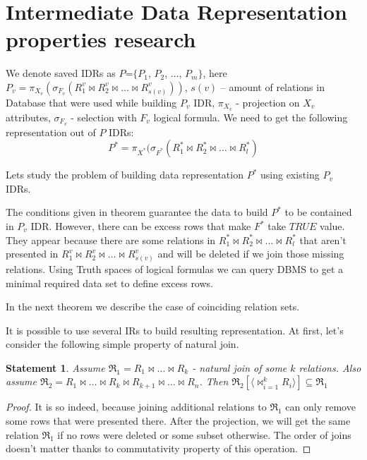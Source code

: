 \documentclass[10pt,a4paper]{article}
\newtheorem{statement}{Statement}
\def \n #1{\mathit{#1}}
\begin{document}
\section{Intermediate Data Representation properties research}

We denote saved IDRs as $P$=$\{ P_1$, $P_2$, $\dots$, $P_m \}$, here $P_v =
\pi_{X_v}(\sigma_{F_v} (R^v_1 \Join R^v_2 \Join \dots \Join R^v_{s(v)} ))$,
$s(v)$ – amount of relations in Database that were used while building $P_v$ IDR,
$\pi_{X_v}$ - projection on $X_v$ attributes, $\sigma_{F_v}$ - selection with
$F_v$ logical formula. We need to get the following representation out of $P$
IDRs:
$$P^{\ast} = \pi_{X^{\ast}}(\sigma_{F^{\ast}} (R^{\ast}_1 \Join R^{\ast}_2\Join
\dots \Join R^{\ast}_l )$$

Lets study the problem of building data representation $P^{\ast}$ using existing
$P_v$ IDRs.



The conditions given in theorem guarantee the data to build $P^{\ast}$ to be contained in $P_v$ IDR. However, there can be excess rows that make $F^{\ast}$ take $\n{TRUE}$ value. They appear because there are some relations in $R^{\ast}_1 \Join R^{\ast}_2\Join \dots \Join R^{\ast}_l $ that aren't presented in $R^v_1 \Join R^v_2 \Join \dots \Join R^v_{s(v)} $ and will be deleted if we join those missing relations. Using Truth spaces of logical formulas we can query DBMS to get a minimal required data set to define excess rows.

In the next theorem we describe the case of coinciding relation sets.



It is possible to use several IRs to build resulting representation. At first,
let's consider the following simple property of natural join.

\begin{statement}
Assume $\Re_1 = R_1 \Join \dots \Join R_k$ - natural join of some $k$ relations. Also assume $\Re_2 = R_1 \Join \dots \Join R_k \Join R_{k+1} \Join \dots \Join R_{n}$. Then $\Re_2 [\langle \Join_{i=1}^{k} R_i \rangle] \subseteq \Re_1$
\label{join_property}
\end{statement}
\begin{proof}
It is so indeed, because joining additional relations to $\Re_1$ can only remove some rows that were presented there. After the projection, we will get the same relation $\Re_1$ if no rows were deleted or some subset otherwise. The order of joins doesn't matter thanks to commutativity property of this operation.
\end{proof}
\end{document}
